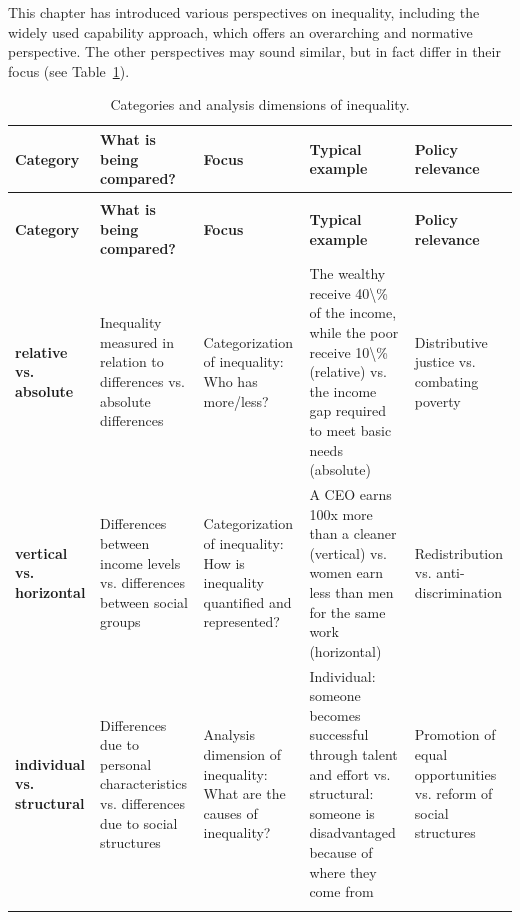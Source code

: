\documentclass[
  a4paper,
  DIV=11,
  numbers=noendperiod,
  oneside,
  openany]{scrreprt}
\begin{document}
This chapter has introduced various perspectives on inequality,
including the widely used capability approach, which offers an
overarching and normative perspective. The other perspectives may sound
similar, but in fact differ in their focus (see
Table~\ref{tbl-inequality-categories}).

\begingroup\fontsize{8}{10}\selectfont

\begin{longtable}[t]{>{\raggedright\arraybackslash}p{1.6cm}>{\raggedright\arraybackslash}p{3.0cm}>{\raggedright\arraybackslash}p{3.0cm}>{\raggedright\arraybackslash}p{3.0cm}l}

\caption{\label{tbl-inequality-categories}Categories and analysis
dimensions of inequality.}

\tabularnewline

\toprule
\textbf{Category} & \textbf{What is being compared?} & \textbf{Focus} & \textbf{Typical example} & \textbf{Policy relevance}\\
\midrule
\endfirsthead
\multicolumn{5}{@{}l}{\textit{(continued)}}\\
\toprule
\textbf{Category} & \textbf{What is being compared?} & \textbf{Focus} & \textbf{Typical example} & \textbf{Policy relevance}\\
\midrule
\endhead

\endfoot
\bottomrule
\endlastfoot
\textbf{relative vs. absolute} & Inequality measured in relation to differences vs. absolute differences & Categorization of inequality: Who has more/less? & The wealthy receive 40\textbackslash{}\% of the income, while the poor receive 10\textbackslash{}\% (relative) vs. the income gap required to meet basic needs (absolute) & Distributive justice vs. combating poverty\\
\textbf{vertical vs. horizontal} & Differences between income levels vs. differences between social groups & Categorization of inequality: How is inequality quantified and represented? & A CEO earns 100x more than a cleaner (vertical) vs. women earn less than men for the same work (horizontal) & Redistribution vs. anti-discrimination\\
\textbf{individual vs. structural} & Differences due to personal characteristics vs. differences due to social structures & Analysis dimension of inequality: What are the causes of inequality? & Individual: someone becomes successful through talent and effort vs. structural: someone is disadvantaged because of where they come from & Promotion of equal opportunities vs. reform of social structures\\*

\end{longtable}
\end{document}

